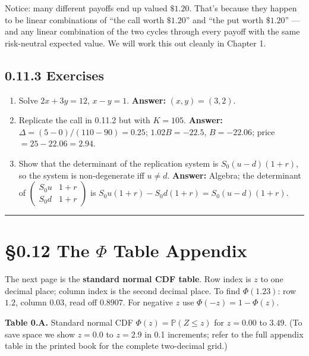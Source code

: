 \documentclass[
  10pt,
  twoside]{book}
\providecommand{\tightlist}{%
  \setlength{\itemsep}{0pt}\setlength{\parskip}{0pt}}
\begin{document}
Notice: many different payoffs end up valued \(\$1.20\). That's because
they happen to be linear combinations of ``the call worth \(\$1.20\)''
and ``the put worth \(\$1.20\)'' --- and any linear combination of the
two cycles through every payoff with the same risk-neutral expected
value. We will work this out cleanly in Chapter 1.

\subsection{0.11.3 Exercises}\label{exercises-10}

\begin{enumerate}
\def\labelenumi{\arabic{enumi}.}
\tightlist
\item
  Solve \(2x + 3y = 12\), \(x - y = 1\). \textbf{Answer:}
  \((x, y) = (3, 2)\).
\item
  Replicate the call in 0.11.2 but with \(K = 105\). \textbf{Answer:}
  \(\Delta = (5 - 0)/(110 - 90) = 0.25\); \(1.02 B = -22.5\),
  \(B = -22.06\); price \(= 25 - 22.06 = 2.94\).
\item
  Show that the determinant of the replication system is
  \(S_0 (u - d)(1 + r)\), so the system is non-degenerate iff
  \(u \neq d\). \textbf{Answer:} Algebra; the determinant of
  \(\begin{pmatrix} S_0 u & 1+r \\ S_0 d & 1+r \end{pmatrix}\) is
  \(S_0 u (1+r) - S_0 d (1+r) = S_0 (u - d)(1 + r)\).
\end{enumerate}

\begin{center}\rule{0.5\linewidth}{0.5pt}\end{center}

\section{\texorpdfstring{§0.12 The \(\Phi\) Table
Appendix}{§0.12 The \textbackslash Phi Table Appendix}}\label{the-phi-table-appendix}

The next page is the \textbf{standard normal CDF table}. Row index is
\(z\) to one decimal place; column index is the second decimal place. To
find \(\Phi(1.23)\): row \(1.2\), column \(0.03\), read off \(0.8907\).
For negative \(z\) use \(\Phi(-z) = 1 - \Phi(z)\).

\textbf{Table 0.A.} Standard normal CDF
\(\Phi(z) = \mathbb{P}(Z \leq z)\) for \(z = 0.00\) to \(3.49\). (To
save space we show \(z = 0.0\) to \(z = 2.9\) in 0.1 increments; refer
to the full appendix table in the printed book for the complete
two-decimal grid.)
\end{document}

